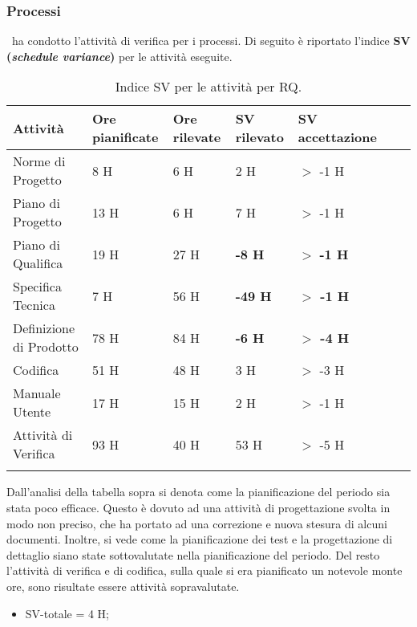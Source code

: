 \subsubsection{Processi}
\gruppo ~ha condotto l'attività di verifica per i processi. Di seguito è riportato l'indice \textbf{SV (\textit{schedule variance})} per le attività eseguite.
\begin{longtable}{lllllXr}
\toprule
\textbf{Attività} & \textbf{Ore pianificate} & \textbf{Ore rilevate} & \textbf{SV rilevato} & \textbf{SV accettazione} \\
\toprule
Norme di Progetto & 8 H & 6 H & 2 H & $>$ -1 H\\
\midrule
Piano di Progetto & 13 H & 6 H & 7 H & $>$ -1 H\\
\midrule
Piano di Qualifica & 19 H & 27 H & \textbf{-8 H} & $>$ \textbf{-1 H}\\
\midrule
Specifica Tecnica & 7 H & 56 H & \textbf{-49 H} & \textbf{$>$ -1 H}\\
\midrule
Definizione di Prodotto & 78 H & 84 H & \textbf{-6 H} & \textbf{$>$ -4 H}\\
\midrule
Codifica & 51 H & 48 H & 3 H & $>$ -3 H\\
\midrule
Manuale Utente & 17 H & 15 H & 2 H & $>$ -1 H\\
\midrule
Attività di Verifica & 93 H & 40 H & 53 H & $>$ -5 H\\
\bottomrule
\caption{Indice SV per le attività per RQ.}
\end{longtable}
Dall'analisi della tabella sopra si denota come la pianificazione del periodo sia stata poco efficace. Questo è dovuto ad una attività di progettazione svolta in modo non preciso, che ha portato ad una correzione e nuova stesura di alcuni documenti. Inoltre, si vede come la pianificazione dei test e la progettazione di dettaglio siano state sottovalutate nella pianificazione del periodo.
Del resto l'attività di verifica e di codifica, sulla quale si era pianificato un notevole monte ore, sono risultate essere attività sopravalutate.
\begin{itemize}
\item SV-totale = 4 H;
\end{itemize}

